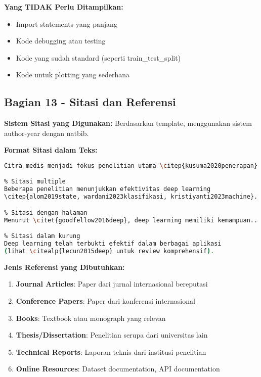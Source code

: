 \textbf{Yang TIDAK Perlu Ditampilkan:}
\begin{itemize}
    \item Import statements yang panjang
    \item Kode debugging atau testing
    \item Kode yang sudah standard (seperti train\_test\_split)
    \item Kode untuk plotting yang sederhana
\end{itemize}

\subsection*{Bagian 13 - Sitasi dan Referensi}

\textbf{Sistem Sitasi yang Digunakan:}
Berdasarkan template, menggunakan sistem author-year dengan natbib.

\textbf{Format Sitasi dalam Teks:}
\begin{lstlisting}[language=bash, style=bash, caption=Contoh Sitasi dalam Teks]
% Sitasi tunggal
Citra medis menjadi fokus penelitian utama \citep{kusuma2020penerapan}.

% Sitasi multiple
Beberapa penelitian menunjukkan efektivitas deep learning
\citep{alom2019state, wardani2023klasifikasi, kristiyanti2023machine}.

% Sitasi dengan halaman
Menurut \citet{goodfellow2016deep}, deep learning memiliki kemampuan...

% Sitasi dalam kurung
Deep learning telah terbukti efektif dalam berbagai aplikasi
(lihat \citealp{lecun2015deep} untuk review komprehensif).
\end{lstlisting}

\textbf{Jenis Referensi yang Dibutuhkan:}
\begin{enumerate}
    \item \textbf{Journal Articles}: Paper dari jurnal internasional bereputasi
    \item \textbf{Conference Papers}: Paper dari konferensi internasional
    \item \textbf{Books}: Textbook atau monograph yang relevan
    \item \textbf{Thesis/Dissertation}: Penelitian serupa dari universitas lain
    \item \textbf{Technical Reports}: Laporan teknis dari institusi penelitian
    \item \textbf{Online Resources}: Dataset documentation, API documentation
\end{enumerate}

